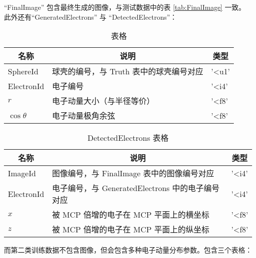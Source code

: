 \documentclass{article}
\begin{document}
“FinalImage” 包含最终生成的图像，与测试数据中的表 \ref{tab:FinalImage} 一致。此外还有“GeneratedElectrons” 与 “DetectedElectrons”：

\begin{table}[H]
    \caption{ 表格}
        \label{tab:GeneratedElectrons}
        \centering
        {
            \begin{tabular}[c]{l|l|l}
                \hline
                \multicolumn{1}{c|}{\textbf{名称}} & 
                \multicolumn{1}{c|}{\textbf{说明}} & 
                \multicolumn{1}{c}{\textbf{类型}} \\
                \hline
                SphereId & 球壳的编号，与 Truth 表中的球壳编号对应 & '<u1' \\
                ElectronId & 电子编号 & '<i4' \\
                $r$ & 电子动量大小（与半径等价） & '<f8' \\
                $\cos\theta$ & 电子动量极角余弦 & '<f8' \\
                \hline
            \end{tabular}
        }
\end{table}

\begin{table}[H]
    \caption{DetectedElectrons 表格}
        \label{tab:DetectedElectrons}
        \centering
        {
            \begin{tabular}[c]{l|l|l}
                \hline
                \multicolumn{1}{c|}{\textbf{名称}} & 
                \multicolumn{1}{c|}{\textbf{说明}} & 
                \multicolumn{1}{c}{\textbf{类型}} \\
                \hline
                ImageId & 图像编号，与 FinalImage 表中的图像编号对应 & '<i4' \\
                ElectronId & 电子编号，与 GeneratedElectrons 中的电子编号对应 & '<i4' \\
                $x$ & 被 MCP 倍增的电子在 MCP 平面上的横坐标 & '<f8' \\
                $z$ & 被 MCP 倍增的电子在 MCP 平面上的纵坐标 & '<f8' \\
                \hline
            \end{tabular}
        }
\end{table}

而第二类训练数据不包含图像，但会包含多种电子动量分布参数。包含三个表格：
\end{document}
